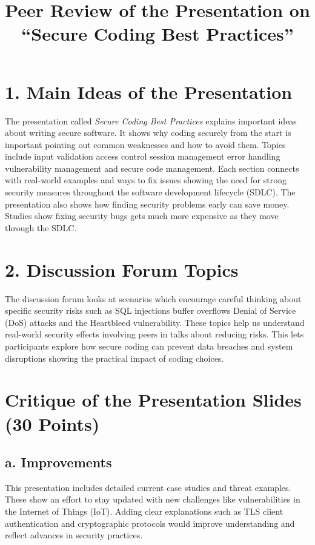 \documentclass{article}
\begin{document}
\title{Peer Review of the Presentation on ``Secure Coding Best Practices''}
\author{}
\date{}

\maketitle

\section*{1. Main Ideas of the Presentation}

The presentation called \textit{Secure Coding Best Practices} explains important ideas about writing secure software. It shows why coding securely from the start is important pointing out common weaknesses and how to avoid them. Topics include input validation access control session management error handling vulnerability management and secure code management. Each section connects with real-world examples and ways to fix issues showing the need for strong security measures throughout the software development lifecycle (SDLC). The presentation also shows how finding security problems early can save money. Studies show fixing security bugs gets much more expensive as they move through the SDLC.

\section*{2. Discussion Forum Topics}

The discussion forum looks at scenarios which encourage careful thinking about specific security risks such as SQL injections buffer overflows Denial of Service (DoS) attacks and the Heartbleed vulnerability. These topics help us understand real-world security effects involving peers in talks about reducing risks. This lets participants explore how secure coding can prevent data breaches and system disruptions showing the practical impact of coding choices.

\section*{Critique of the Presentation Slides (30 Points)}

\subsection*{a. Improvements}

This presentation includes detailed current case studies and threat examples. These show an effort to stay updated with new challenges like vulnerabilities in the Internet of Things (IoT). Adding clear explanations such as TLS client authentication and cryptographic protocols would improve understanding and reflect advances in security practices.
\end{document}
